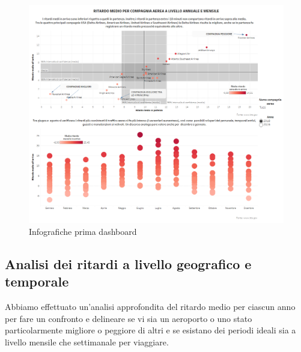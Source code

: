 \documentclass[12pt]{article}
\begin{document}
\begin{figure}[H]
    \hspace{-33pt}
    \includegraphics[scale = 0.53]{img/dashboard/Dashboard1.png}
    \caption{Infografiche prima dashboard}
\end{figure}

\newpage
\subsection {Analisi dei ritardi a livello geografico e temporale}
Abbiamo effettuato un'analisi approfondita del ritardo medio per ciascun anno per fare un confronto e delineare se vi sia un aeroporto o uno stato particolarmente migliore o peggiore di altri e se esistano dei periodi ideali sia a livello mensile che settimanale per viaggiare.
\end{document}
